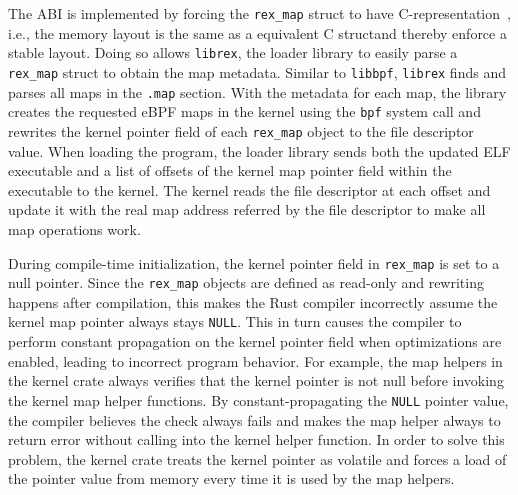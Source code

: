 The ABI is implemented by forcing the \texttt{rex\_map} struct to have
    C-representation~\cite{nomicon-reprc}, i.e., the memory layout
    is the same as a equivalent C structand thereby enforce a stable layout.
Doing so allows \texttt{librex}, the \projname{} loader library to easily parse
    a \texttt{rex\_map} struct to obtain the map metadata.
Similar to \texttt{libbpf}, \texttt{librex} finds and parses all maps in the
    \texttt{.map} section.
With the metadata for each map, the library creates the requested eBPF maps in
    the kernel using the \texttt{bpf} system call and rewrites the kernel
    pointer field of each \texttt{rex\_map} object to the file descriptor value.
When loading the program, the loader library sends both the updated ELF
    executable and a list of offsets of the kernel map pointer field within the
    executable to the kernel.
The kernel reads the file descriptor at each offset and update it with the real
    map address referred by the file descriptor to make all map operations
    work.

During compile-time initialization, the kernel pointer field in
    \texttt{rex\_map} is set to a null pointer.
Since the \texttt{rex\_map} objects are defined as read-only and rewriting
    happens after compilation, this makes the Rust compiler incorrectly assume
    the kernel map pointer always stays \texttt{NULL}.
This in turn causes the compiler to perform constant propagation on the kernel
    pointer field when optimizations are enabled, leading to incorrect program
    behavior.
For example, the \projname{} map helpers in the \projname{} kernel crate always
    verifies that the kernel pointer is not null before invoking the kernel map
    helper functions.
By constant-propagating the \texttt{NULL} pointer value, the compiler believes
    the check always fails and makes the map helper always to return error
    without calling into the kernel helper function.
In order to solve this problem, the \projname{} kernel crate treats the kernel
    pointer as volatile and forces a load of the pointer value from memory
    every time it is used by the map helpers.

